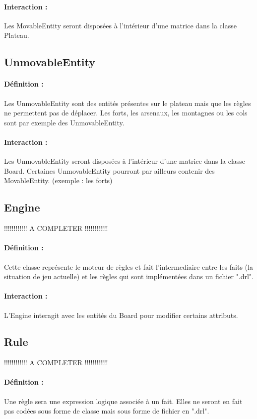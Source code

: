 			\paragraph{Interaction :}
			Les MovableEntity seront disposées à l'intérieur d'une matrice dans la classe Plateau.

		\subsection*{UnmovableEntity}

			\paragraph{Définition :}
			Les UnmovableEntity sont des entités présentes sur le plateau mais que les règles ne permettent pas de déplacer. 
			Les forts, les arsenaux, les montagnes ou les cols sont par exemple des UnmovableEntity.
			\paragraph{Interaction :}
			Les UnmovableEntity seront disposées à l'intérieur d'une matrice dans la classe Board. 
			Certaines UnmovableEntity pourront par ailleurs contenir des MovableEntity. (exemple : les forts)

		\subsection*{Engine}

			!!!!!!!!!!!! A COMPLETER !!!!!!!!!!!!
			\paragraph{Définition :}
			Cette classe représente le moteur de règles et fait l'intermediaire entre les faits (la situation de jeu actuelle) 
			et les règles qui sont implémentées dans un fichier ".drl".
			\paragraph{Interaction :}
			L'Engine interagit avec les entités du Board pour modifier certains attributs.

		\subsection*{Rule}

			!!!!!!!!!!!! A COMPLETER !!!!!!!!!!!!
			\paragraph{Définition :}
			Une règle sera une expression logique associée à un fait. Elles ne seront en fait pas codées sous forme de classe mais 
			sous forme de fichier en ".drl".
